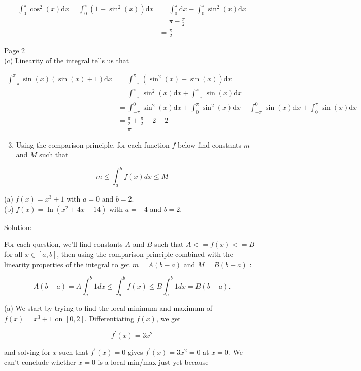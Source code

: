 \documentclass[10pt]{article}
\begin{document}
$$
\begin{aligned}
\int_{0}^{\pi} \cos ^{2}(x) \mathrm{d} x=\int_{0}^{\pi}\left(1-\sin ^{2}(x)\right) \mathrm{d} x & =\int_{0}^{\pi} \mathrm{d} x-\int_{0}^{\pi} \sin ^{2}(x) \mathrm{d} x \\
& =\pi-\frac{\pi}{2} \\
& =\frac{\pi}{2}
\end{aligned}
$$

Page 2\\
(c) Linearity of the integral tells us that

$$
\begin{aligned}
\int_{-\pi}^{\pi} \sin (x)(\sin (x)+1) \mathrm{d} x & =\int_{-\pi}^{\pi}\left(\sin ^{2}(x)+\sin (x)\right) \mathrm{d} x \\
& =\int_{-\pi}^{\pi} \sin ^{2}(x) \mathrm{d} x+\int_{-\pi}^{\pi} \sin (x) \mathrm{d} x \\
& =\int_{-\pi}^{0} \sin ^{2}(x) \mathrm{d} x+\int_{0}^{\pi} \sin ^{2}(x) \mathrm{d} x+\int_{-\pi}^{0} \sin (x) \mathrm{d} x+\int_{0}^{\pi} \sin (x) \mathrm{d} x \\
& =\frac{\pi}{2}+\frac{\pi}{2}-2+2 \\
& =\pi
\end{aligned}
$$

\begin{enumerate}
  \setcounter{enumi}{2}
  \item Using the comparison principle, for each function $f$ below find constants $m$ and $M$ such that
\end{enumerate}

$$
m \leq \int_{a}^{b} f(x) d x \leq M
$$

(a) $f(x)=x^{3}+1$ with $a=0$ and $b=2$.\\
(b) $f(x)=\ln \left(x^{2}+4 x+14\right)$ with $a=-4$ and $b=2$.

Solution:

For each question, we'll find constants $A$ and $B$ such that $A<=f(x)<=B$ for all $x \in[a, b]$, then using the comparison principle combined with the linearity properties of the integral to get $m=A(b-a)$ and $M=B(b-a)$ :

$$
A(b-a)=A \int_{a}^{b} 1 d x \leq \int_{a}^{b} f(x) \leq B \int_{a}^{b} 1 d x=B(b-a) .
$$

(a) We start by trying to find the local minimum and maximum of $f(x)=x^{3}+1$ on $[0,2]$. Differentiating $f(x)$, we get

$$
f^{\prime}(x)=3 x^{2}
$$

and solving for $x$ such that $f^{\prime}(x)=0$ gives $f^{\prime}(x)=3 x^{2}=0$ at $x=0$. We can't conclude whether $x=0$ is a local min/max just yet because
\end{document}
